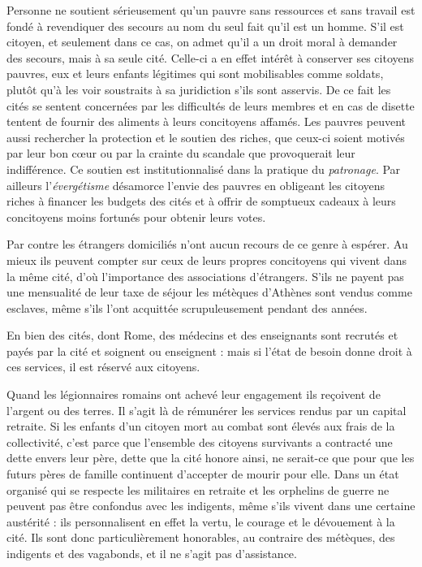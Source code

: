  Personne ne soutient sérieusement qu'un pauvre sans ressources et sans travail est fondé à revendiquer des secours au nom du seul fait qu'il est un homme. S'il est citoyen, et seulement dans ce cas, on admet qu'il a un droit moral à demander des secours, mais à sa seule cité. Celle-ci a en effet intérêt à conserver ses citoyens pauvres, eux et leurs enfants légitimes qui sont mobilisables comme soldats, plutôt qu'à les voir soustraits à sa juridiction s'ils sont asservis. De ce fait les cités se sentent concernées par les difficultés de leurs membres et en cas de disette tentent de fournir des aliments à leurs concitoyens affamés. Les pauvres peuvent aussi rechercher la protection et le soutien des riches, que ceux-ci soient motivés par leur bon cœur ou par la crainte du scandale que provoquerait leur indifférence. Ce soutien est institutionnalisé dans la pratique du \emph{patronage}. Par ailleurs l'\emph{évergétisme} désamorce l'envie des pauvres en obligeant les citoyens riches à financer les budgets des cités et à offrir de somptueux cadeaux à leurs concitoyens moins fortunés pour obtenir leurs votes.

 Par contre les étrangers domiciliés n'ont aucun recours de ce genre à espérer. Au mieux ils peuvent compter sur ceux de leurs propres concitoyens qui vivent dans la même cité, d'où l'importance des associations d'étrangers. S'ils ne payent pas une mensualité de leur taxe de séjour les métèques d'Athènes sont vendus comme esclaves, même s'ils l'ont acquittée scrupuleusement pendant des années.

 En bien des cités, dont Rome, des médecins et des enseignants sont recrutés et payés par la cité et soignent ou enseignent : mais si l'état de besoin donne droit à ces services, il est réservé aux citoyens. 

 Quand les légionnaires romains ont achevé leur engagement ils reçoivent de l'argent ou des terres. Il s'agit là de rémunérer les services rendus par un capital retraite. Si les enfants d'un citoyen mort au combat sont élevés aux frais de la collectivité, c'est parce que l'ensemble des citoyens survivants a contracté une dette envers leur père, dette que la cité honore ainsi, ne serait-ce que pour que les futurs pères de famille continuent d'accepter de mourir pour elle. Dans un état organisé qui se respecte les militaires en retraite et les orphelins de guerre ne peuvent pas être confondus avec les indigents, même s'ils vivent dans une certaine austérité : ils personnalisent en effet la vertu, le courage et le dévouement à la cité. Ils sont donc particulièrement honorables, au contraire des métèques, des indigents et des vagabonds, et il ne s'agit pas d'assistance.

